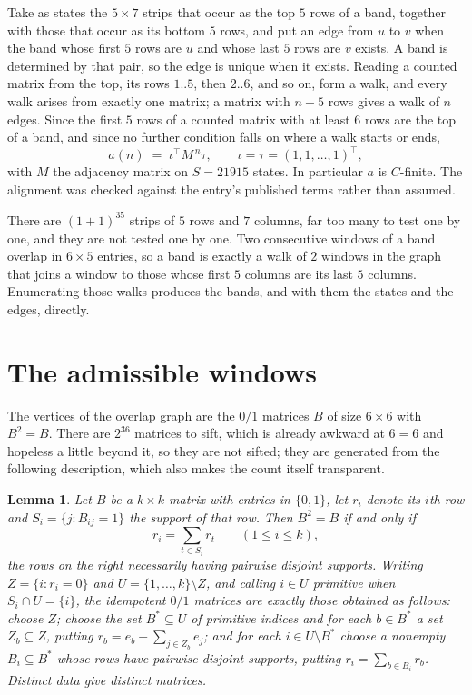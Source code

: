 \documentclass[11pt,a4paper]{article}
\theoremstyle{plain}
\newtheorem{lemma}[theorem]{Lemma}
\theoremstyle{definition}
\begin{document}
Take as states the $5\times7$ strips that occur as the top $5$ rows of a band,
together with those that occur as its bottom $5$ rows, and put an edge from $u$ to $v$
when the band whose first $5$ rows are $u$ and whose last $5$ rows are $v$ exists.
A band is determined by that pair, so the edge is unique when it exists. Reading a counted
matrix from the top, its rows $1..5$, then $2..6$, and so on, form a walk, and every
walk arises from exactly one matrix; a matrix with $n+5$ rows gives a walk of $n$ edges.
Since the first $5$ rows of a counted matrix with at least $6$ rows are the top of a
band, and since no further condition falls on where a walk starts or ends,
\[
a(n)\;=\;\iota^{\!\top}M^{\,n}\tau ,\qquad \iota=\tau=(1,1,\dots,1)^{\!\top},
\]
with $M$ the adjacency matrix on $S=21915$ states. In particular $a$ is $C$-finite. The
alignment was checked against the entry's published terms rather than assumed.

There are $(1 + 1)^{35}$ strips of $5$ rows and $7$ columns, far too
many to test one by one, and they are not tested one by one. Two consecutive windows of a band
overlap in $6\times5$ entries, so a band is exactly a walk of $2$ windows in
the graph that joins a window to those whose first $5$ columns are its last $5$
columns. Enumerating those walks produces the bands, and with them the states and the edges,
directly.

\section{The admissible windows}

The vertices of the overlap graph are the $0/1$ matrices $B$ of size $6\times6$ with
$B^2=B$. There are $2^{36}$ matrices to sift, which is already awkward at $6=6$ and
hopeless a little beyond it, so they are not sifted; they are generated from the following
description, which also makes the count itself transparent.

\begin{lemma}\label{lem:idem}
Let $B$ be a $k\times k$ matrix with entries in $\{0,1\}$, let $r_i$ denote its $i$th row and
$S_i=\{j:B_{ij}=1\}$ the support of that row. Then $B^2=B$ if and only if
\[
r_i=\sum_{t\in S_i}r_t \qquad (1\le i\le k),
\]
the rows on the right necessarily having pairwise disjoint supports. Writing
$Z=\{i:r_i=0\}$ and $U=\{1,\dots,k\}\setminus Z$, and calling $i\in U$ \emph{primitive}
when $S_i\cap U=\{i\}$, the idempotent $0/1$ matrices are exactly those obtained as follows:
choose $Z$; choose the set $B^{\ast}\subseteq U$ of primitive indices and for each
$b\in B^{\ast}$ a set $Z_b\subseteq Z$, putting $r_b=e_b+\sum_{j\in Z_b}e_j$; and for each
$i\in U\setminus B^{\ast}$ choose a nonempty $B_i\subseteq B^{\ast}$ whose rows have
pairwise disjoint supports, putting $r_i=\sum_{b\in B_i}r_b$. Distinct data give distinct
matrices.
\end{lemma}
\end{document}

